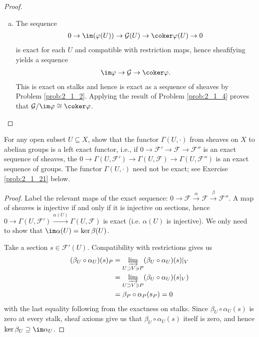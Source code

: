 \begin{problemset}
\begin{proof}
\begin{enumerate}[(a)]
			\item The sequence
				\begin{align*}
					0 \to \im(\varphi(U)) \to \mathcal G(U) \to \coker \varphi(U) \to 0
				\end{align*}
				is exact for each $U$ and compatible with restriction maps, hence sheafifying yields a sequence
				\begin{align*}
					\im \varphi \to \mathcal G\to \coker\varphi.
				\end{align*}
				This is exact on stalks and hence is exact as a sequence of sheaves by Problem \ref{prob:2_1_2}. Applying the result of Problem \ref{prob:2_1_4} proves that $\mathcal G/\im \varphi \cong \coker \varphi$.
		\end{enumerate}
	\end{proof}
	\item For any open subset $U\subseteq X$, show that the functor $\Gamma(U,\cdot)$ from sheaves on $X$ to abelian groups is a left exact functor, i.e., if $0\to \mathcal F'\to \mathcal F\to \mathcal F''$ is an exact sequence of sheaves, the $0\to \Gamma(U,\mathcal F') \to \Gamma(U,\mathcal F)\to \Gamma(U, \mathcal F'')$ is an exact sequence of groups. The functor $\Gamma(U,\cdot)$ need not be exact; see Exercise \ref{prob:2_1_21} below.
	\begin{proof}
		Label the relevant maps of the exact sequence: $0\to \mathcal F\xrightarrow{\alpha}\mathcal F\xrightarrow{\beta} \mathcal F''$. A map of sheaves is injective if and only if it is injective on sections, hence $0 \to \Gamma(U,\mathcal F') \xrightarrow{\alpha(U)} \Gamma(U,\mathcal F)$ is exact (i.e. $\alpha(U)$ is injective). We only need to show that $\im\alpha (U) = \ker \beta (U)$.

		Take a section $s\in \mathcal F'(U)$. Compatibility with restrictions gives us
		\begin{align*}
			(\beta_U\circ \alpha_U)(s)_P 
			&= \varinjlim_{U\supset V \ni P} (\beta_U\circ \alpha_U)(s)|_V \\
			&= \varinjlim_{U\supset V\ni P} (\beta_U\circ \alpha_U)(s|_V) \\
			&= \beta_P\circ \alpha_P (s_P) = 0
		\end{align*}
		with the last equality following from the exactness on stalks. Since $\beta_U\circ \alpha_U(s)$ is zero at every stalk, sheaf axioms give us that $\beta_U\circ \alpha_U(s)$ itself is zero, and hence $\ker \beta_U\supseteq \im\alpha_U$.


\end{proof}
\end{problemset}
